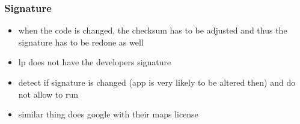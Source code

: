 \subsubsection{Signature} \label{subsection:counter-improve-tampering-signature}
\begin{itemize}
  \item when the code is changed, the checksum has to be adjusted and thus the signature has to be redone as well
  \item lp does not have the developers signature
  \item detect if signature is changed (app is very likely to be altered then) and do not allow to run
  \item similar thing does google with their maps license
\end{itemize}
